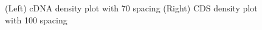 \documentclass[12pt]{article}
\begin{document}
\begin{figure}[H]
  \noindent\par
  \hfill
  \par
  \caption{(Left) cDNA density plot with 70 spacing (Right) CDS density plot with 100 spacing}
  \end{figure}
\end{document}
